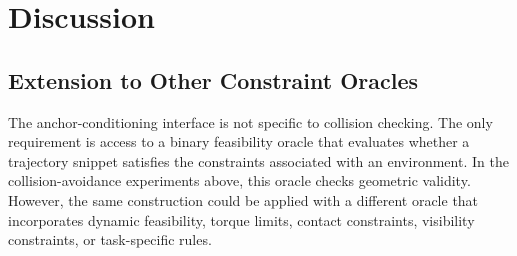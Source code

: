 



\section{Discussion}

\subsection{Extension to Other Constraint Oracles}

The anchor-conditioning interface is not specific to collision checking. The only requirement is access to a binary feasibility oracle that evaluates whether a trajectory snippet satisfies the constraints associated with an environment. In the collision-avoidance experiments above, this oracle checks geometric validity. However, the same construction could be applied with a different oracle that incorporates dynamic feasibility, torque limits, contact constraints, visibility constraints, or task-specific rules.

